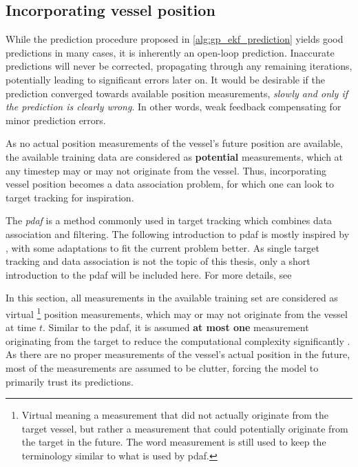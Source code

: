 \subsection{Incorporating vessel position}
While the prediction procedure proposed in \cref{alg:gp_ekf_prediction} yields good predictions in many cases, it is inherently an open-loop prediction. Inaccurate predictions will never be corrected, propagating through any remaining iterations, potentially leading to significant errors later on.  It would be desirable if the prediction converged towards available position measurements, \textit{slowly and only if the prediction is clearly wrong}. In other words, weak feedback compensating for minor prediction errors.

As no actual position measurements of the vessel's future position are available, the available training data are considered as \textbf{potential} measurements, which at any timestep may or may not originate from the vessel. Thus, incorporating vessel position becomes a data association problem, for which one can look to target tracking for inspiration.

The \textit{\acrfull{pdaf}} is a method commonly used in target tracking which combines data association and filtering. The following introduction to \acrshort{pdaf} is mostly inspired by \cite{sensorfusjon}, with some adaptations to fit the current problem better. As single target tracking and data association is not the topic of this thesis, only a short introduction to the \acrshort{pdaf} will be included here. For more details, see \cite{sensorfusjon,bar1995multitarget}

In this section, all measurements in the available training set are considered as virtual \footnote{Virtual meaning a measurement that did not actually originate from the target vessel, but rather a measurement that could potentially originate from the target in the future. The word measurement is still used to keep the terminology similar to what is used by \acrshort{pdaf}.} position measurements, which may or may not originate from the vessel at time $t$. Similar to the \acrshort{pdaf}, it is assumed \textbf{at most one} measurement originating from the target to reduce the computational complexity significantly \cite{sensorfusjon}. As there are no proper measurements of the vessel's actual position in the future, most of the measurements are assumed to be clutter, forcing the model to primarily trust its predictions.

